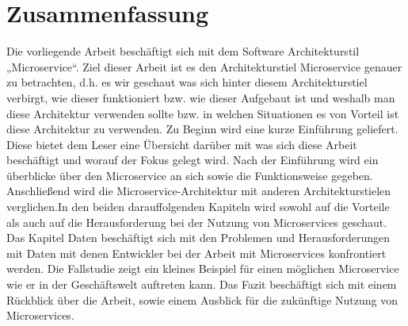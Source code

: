 \chapter*{Zusammenfassung}
Die vorliegende Arbeit beschäftigt sich mit dem Software Architekturstil „Microservice“. Ziel dieser Arbeit ist es den Architekturstiel Microservice genauer zu betrachten, d.h. es wir geschaut was sich hinter diesem Architekturstiel verbirgt, wie dieser funktioniert bzw. wie dieser Aufgebaut ist und weshalb man diese Architektur verwenden sollte bzw. in welchen Situationen es von Vorteil ist diese Architektur zu verwenden.\newline\newline
Zu Beginn wird eine kurze Einführung geliefert. Diese bietet dem Leser eine Übersicht darüber mit was sich diese Arbeit beschäftigt und worauf der Fokus gelegt wird. Nach der Einführung wird ein überblicke über den Microservice an sich sowie die Funktionsweise gegeben. Anschließend wird die Microservice-Architektur mit anderen Architekturstielen verglichen.\newline In den beiden darauffolgenden Kapiteln wird sowohl auf die Vorteile als auch auf die Herausforderung bei der Nutzung von Microservices geschaut. Das Kapitel Daten beschäftigt sich mit den Problemen und Herausforderungen mit Daten mit denen Entwickler bei der Arbeit mit Microservices konfrontiert werden. Die Fallstudie zeigt ein kleines Beispiel für einen möglichen Microservice wie er in der Geschäftswelt auftreten kann. Das Fazit beschäftigt sich mit einem Rückblick über die Arbeit, sowie einem Ausblick für die zukünftige Nutzung von Microservices.